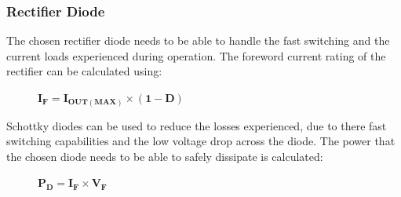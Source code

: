 \newpage
\subsubsection{Rectifier Diode}
\vspace{-2mm}
The chosen rectifier diode needs to be able to handle the fast switching and the current loads experienced during operation. The foreword current rating of the rectifier can be calculated using:
\vspace{-2mm}
\begin{figure}[H]
    \centering
    $\mathbf{I_F = I_{OUT(MAX)}\times(1-D)}$ 
\end{figure}
\vspace{-6mm}
Schottky diodes can be used to reduce the losses experienced, due to there fast switching capabilities and the low voltage drop across the diode.
The power that the chosen diode needs to be able to safely dissipate is calculated:
\begin{figure}[H]
    \centering
    $\mathbf{P_D = I_F\times V_F}$ 
\end{figure}
\vspace{-5mm}
